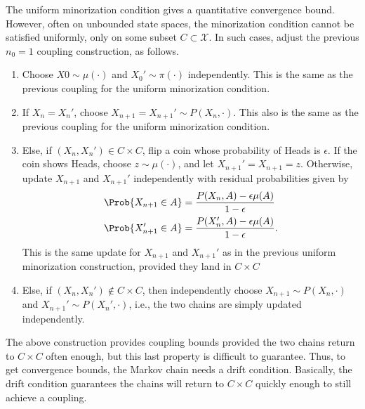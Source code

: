 \documentclass[12pt]{article}
\begin{document}
The uniform minorization condition gives a quantitative convergence
bound.  However, often on unbounded state spaces, the minorization
condition cannot be satisfied uniformly, only on some subset \( C
\subset \mathcal{X} \).  In such cases, adjust the previous \( n_0 = 1 \)
coupling construction, as follows.
\begin{enumerate}
    \item
        Choose \( X0 \sim \mu(\cdot) \) and \( X_0' \sim \pi(\cdot) \)
        independently.  This is the same as the previous coupling for
        the uniform minorization condition.
    \item
        If \( X_n = X_n' \), choose \( X_{n+1} = X_{n+1}' \sim P(X_n,
        \cdot) \).  This also is the same as the previous coupling for
        the uniform minorization condition.
    \item
        Else, if \( (X_n , X_n') \in C \times C \), flip a coin whose
        probability of Heads is \( \epsilon \).  If the coin shows
        Heads, choose \( z \sim \mu(\cdot) \), and let \( X_{n+1}' = X_{n+1}
        = z \).  Otherwise, update \( X_{n+1} \) and \( X_{n+1}' \)
        independently with residual probabilities given by
        \begin{align*}
            \Prob{X_{n+1} \in A} &= \frac{P(X_n, A) - \epsilon \mu(A)}{1-\epsilon}
            \\
            \Prob{X_{n+1}' \in A} &= \frac{P(X_n', A) - \epsilon \mu(A)}
            {1-\epsilon}.  \\
        \end{align*}
        This is the same update for \( X_{n+1} \) and \( X_{n+1}' \) as
        in the previous uniform minorization construction, provided they
        land in \( C \times C \)
    \item
        Else, if \( (X_n, X_n' ) \notin C \times C \), then
        independently choose \( X_{n+1} \sim P(X_n, \cdot) \) and \( X_{n+1}'
        \sim P(X_n', \cdot) \), i.e., the two chains are simply updated
        independently.
\end{enumerate}

The above construction provides coupling bounds provided the two chains
return to \( C \times C \) often enough, but this last property is
difficult to guarantee.  Thus, to get convergence bounds, the Markov
chain needs a drift condition.  Basically, the drift condition
guarantees the chains will return to \( C \times C \) quickly enough to
still achieve a coupling.
\end{document}

